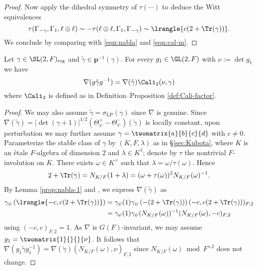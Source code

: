 \documentclass[a4paper,10pt]{article}
\begin{document}
\begin{proof}
	Now apply the dihedral symmetry \cite[p.532]{Li11} of $\tau(\cdots)$ to deduce the Witt equivalences
	\[ \tau(\Gamma_{-\gamma}, \Gamma_1, \ell \oplus \ell) \sim -\tau(\ell \oplus \ell, \Gamma_1, \Gamma_{-\gamma}) \sim \lrangle{c(2 + \Tr(\gamma))}. \]
	We conclude by comparing with \eqref{eqn:nabla} and \eqref{eqn:cal-m}.
\end{proof}

\begin{lemma}\label{prop:nabla-2}
	Let $\gamma \in \SL(2,F)_{\mathrm{reg}}$ and $\tilde{\gamma} \in \bm{p}^{-1}(\gamma)$. For every $g_1 \in \GL(2, F)$ with $\nu := \det g_1$ we have
	\[ \nabla(g\tilde{\gamma}g^{-1}) = \nabla(\tilde{\gamma}) \Cali_2(\nu, \gamma) \]
	where $\Cali_2$ is defined as in Definition--Proposition \ref{def:Cali-factor}.
\end{lemma}
\begin{proof}
	We may also assume $\tilde{\gamma} = \sigma_\text{LP}(\gamma)$ since $\nabla$ is genuine. Since $\nabla(\tilde{\gamma}) = |\det(\gamma + 1)|^{1/2} (\Theta^+_\psi - \Theta^-_\psi)(\tilde{\gamma})$ is locally constant, upon perturbation we may further assume $\gamma = \twomatrix{a}{b}{c}{d}$ with $c \neq 0$. Parameterize the stable class of $\gamma$ by $(K, F, \lambda)$ as in \S\ref{sec:Kubota}, where $K$ is an étale $F$-algebra of dimension $2$ and $\lambda \in K^1$; denote by $\tau$ the nontrivial $F$-involution on $K$. There exists $\omega \in K^\times$ such that $\lambda = \omega/\tau(\omega)$. Hence
	\[ 2 + \Tr(\gamma) = N_{K/F}(1 + \lambda) = (\omega + \tau(\omega))^2 N_{K/F}(\omega)^{-1}. \]
	By Lemma \ref{prop:nabla-1} and \cite[Proposition 1.3.4]{Per81}, we express $\nabla(\tilde{\gamma})$ as
	\begin{equation}\label{eqn:nabla-new} \begin{aligned}
		\gamma_\psi\left( \lrangle{-c, c(2 + \Tr(\gamma))} \right) & = \gamma_\psi(1) \gamma_\psi\left(- (2 + \Tr(\gamma)) \right) (-c, c(2 + \Tr(\gamma)))_{F,2} \\
		& = \gamma_\psi(1) \gamma_\psi(N_{K/F}(\omega))^{-1} (N_{K/F}(\omega), -c)_{F,2}
	\end{aligned}\end{equation}
	using $(-c,c)_{F,2} = 1$. As $\nabla$ is $G(F)$-invariant, we may assume $g_1 = \twomatrix{1}{}{}{\nu}$. It follows that $\nabla(g_1 \tilde{\gamma} g_1^{-1}) = \nabla(\tilde{\gamma}) (N_{K/F}(\omega), \nu)_{F,2}$ since $N_{K/F}(\omega) \bmod F^{\times 2}$ does not change.
\end{proof}
\end{document}
